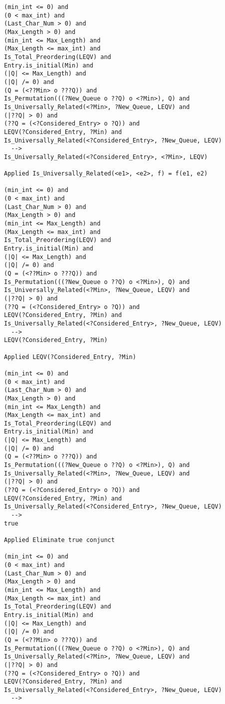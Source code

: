 \begin{lstlisting}[language=resolve]
(min_int <= 0) and
(0 < max_int) and
(Last_Char_Num > 0) and
(Max_Length > 0) and
(min_int <= Max_Length) and
(Max_Length <= max_int) and
Is_Total_Preordering(LEQV) and
Entry.is_initial(Min) and
(|Q| <= Max_Length) and
(|Q| /= 0) and
(Q = (<??Min> o ???Q)) and
Is_Permutation(((?New_Queue o ??Q) o <?Min>), Q) and
Is_Universally_Related(<?Min>, ?New_Queue, LEQV) and
(|??Q| > 0) and
(??Q = (<?Considered_Entry> o ?Q)) and
LEQV(?Considered_Entry, ?Min) and
Is_Universally_Related(<?Considered_Entry>, ?New_Queue, LEQV)
  -->
Is_Universally_Related(<?Considered_Entry>, <?Min>, LEQV)

Applied Is_Universally_Related(<e1>, <e2>, f) = f(e1, e2)

(min_int <= 0) and
(0 < max_int) and
(Last_Char_Num > 0) and
(Max_Length > 0) and
(min_int <= Max_Length) and
(Max_Length <= max_int) and
Is_Total_Preordering(LEQV) and
Entry.is_initial(Min) and
(|Q| <= Max_Length) and
(|Q| /= 0) and
(Q = (<??Min> o ???Q)) and
Is_Permutation(((?New_Queue o ??Q) o <?Min>), Q) and
Is_Universally_Related(<?Min>, ?New_Queue, LEQV) and
(|??Q| > 0) and
(??Q = (<?Considered_Entry> o ?Q)) and
LEQV(?Considered_Entry, ?Min) and
Is_Universally_Related(<?Considered_Entry>, ?New_Queue, LEQV)
  -->
LEQV(?Considered_Entry, ?Min)

Applied LEQV(?Considered_Entry, ?Min)

(min_int <= 0) and
(0 < max_int) and
(Last_Char_Num > 0) and
(Max_Length > 0) and
(min_int <= Max_Length) and
(Max_Length <= max_int) and
Is_Total_Preordering(LEQV) and
Entry.is_initial(Min) and
(|Q| <= Max_Length) and
(|Q| /= 0) and
(Q = (<??Min> o ???Q)) and
Is_Permutation(((?New_Queue o ??Q) o <?Min>), Q) and
Is_Universally_Related(<?Min>, ?New_Queue, LEQV) and
(|??Q| > 0) and
(??Q = (<?Considered_Entry> o ?Q)) and
LEQV(?Considered_Entry, ?Min) and
Is_Universally_Related(<?Considered_Entry>, ?New_Queue, LEQV)
  -->
true

Applied Eliminate true conjunct

(min_int <= 0) and
(0 < max_int) and
(Last_Char_Num > 0) and
(Max_Length > 0) and
(min_int <= Max_Length) and
(Max_Length <= max_int) and
Is_Total_Preordering(LEQV) and
Entry.is_initial(Min) and
(|Q| <= Max_Length) and
(|Q| /= 0) and
(Q = (<??Min> o ???Q)) and
Is_Permutation(((?New_Queue o ??Q) o <?Min>), Q) and
Is_Universally_Related(<?Min>, ?New_Queue, LEQV) and
(|??Q| > 0) and
(??Q = (<?Considered_Entry> o ?Q)) and
LEQV(?Considered_Entry, ?Min) and
Is_Universally_Related(<?Considered_Entry>, ?New_Queue, LEQV)
  -->



\end{lstlisting}
